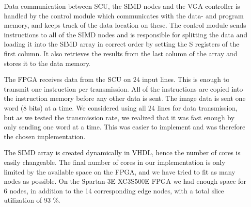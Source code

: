 Data communication between \ac{SCU}, the \ac{SIMD} nodes and the \ac{VGA}
controller is handled by the control module which communicates with the data-
and program memory, and keeps track of the data location on these. The control
module sends instructions to all of the \ac{SIMD} nodes and is responsible for
splitting the data and loading it into the \ac{SIMD} array in correct order by
setting the S registers of the first column. It also retrieves the results from
the last column of the array and stores it to the data memory.

The \ac{FPGA} receives data from the SCU on 24 input lines. This is enough to
transmit one instruction per transmission. All of the instructions are copied
into the instruction memory before any other data is sent. The image data is
sent one word (8 bits) at a time. We considered using all 24 lines for data
transmission, but as we tested the transmission rate, we realized that it was
fast enough by only sending one word at a time. This was easier to
implement and was therefore the chosen implementation.

The \ac{SIMD} array is created dynamically in \ac{VHDL}, hence the
number of cores is easily changeable. The final number of cores in our
implementation is only limited by the available space on the \ac{FPGA},
and we have tried to fit as many nodes as possible. On the Spartan-3E
XC3S500E \ac{FPGA} we had enough space for 6 nodes, in addition to the
14 corresponding edge nodes, with a total slice utilization of 93 \%.
